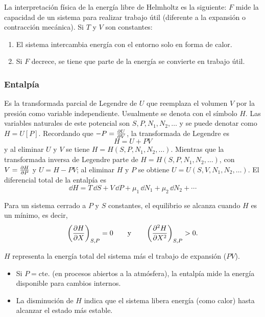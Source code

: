La interpretación física de la energía libre de Helmholtz es la siguiente: $F$ mide la capacidad de un
sistema para realizar trabajo útil (diferente a la expansión o contracción mecánica). Si $T$ y $V$ son
constantes:
\begin{enumerate}[label=\arabic*.,itemsep=0pt]
  \item El sistema intercambia energía con el entorno solo en forma de calor.
  \item Si $F$ decrece, se tiene que parte de la energía se convierte en trabajo útil.
\end{enumerate}

\subsubsection*{Entalpía}

Es la transformada parcial de Legendre de $U$ que reemplaza el volumen $V$ por la presión como
variable independiente. Usualmente se denota con el símbolo $H$. Las variables naturales de este
potencial son $S,P,N_1,N_2,\dots$ y se puede denotar como $H=U[P]$. Recordando que $-P=\pdv{U}{V}$, la
transformada de Legendre es
\begin{equation*}
  \boxed{H=U+PV}
\end{equation*}
y al eliminar $U$ y $V$ se tiene $H=H(S,P,N_1,N_2,\dots)$. Mientras que la transformada inversa de
Legendre parte de $H=H(S,P,N_1,N_2,\dots)$, con $V=\pdv{H}{P}$ y $U=H-PV$; al eliminar $H$ y $P$ se
obtiene $U=U(S,V,N_1,N_2,\dots)$. El diferencial total de la entalpía es
\begin{equation*}
  \dd H=T\,\dd S+V\,\dd P+\mu_1\,\dd N_1+\mu_2\,\dd N_2+\cdots
\end{equation*}

\begin{ley}
  Para un sistema cerrado a $P$ y $S$ constantes, el equilibrio se alcanza cuando $H$ es un mínimo,
  es decir,
  \begin{equation*}
    \left(\frac{\partial H}{\partial X}\right)_{S,P}=0\qquad\text{y}\qquad\left(\frac{\partial^{2}H}{\partial X^{2}}\right)_{S,P}>0.
  \end{equation*}
\end{ley}

$H$ representa la energía total del sistema más el trabajo de expansión ($PV$).
\begin{itemize}[itemsep=0pt]
  \item Si $P=\text{cte.}$ (en procesos abiertos a la atmósfera), la entalpía mide la energía
    disponible para cambios internos.
  \item La disminución de $H$ indica que el sistema libera energía (como calor) hasta alcanzar el
    estado más estable.
\end{itemize}

